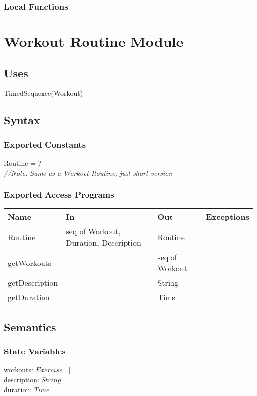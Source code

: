 \documentclass[12pt, titlepage]{article}
\begin{document}
\subsubsection{Local Functions}

\newpage

\section{Workout Routine Module}

\subsection{Uses}
TimedSequence(Workout)
\subsection{Syntax}

\subsubsection{Exported Constants}
Routine = ? \\
\textit{//Note: Same as a Workout Routine, just short version}
\subsubsection{Exported Access Programs}

\begin{center}
	\begin{tabular}{p{2cm} p{4cm} p{4cm} p{2cm}}
		\hline
		\textbf{Name} & \textbf{In} & \textbf{Out} & \textbf{Exceptions} \\
		\hline
		Routine & seq of Workout, Duration, Description & Routine &  \\
		getWorkouts &  & seq of Workout &  \\
		getDescription &  & String &  \\
		getDuration &  & Time &  \\
		\hline
	\end{tabular}
\end{center}

\subsection{Semantics}

\subsubsection{State Variables}
workouts: $Exercise[]$ \\
description: $String$ \\
duration: $Time$ \\
\end{document}
